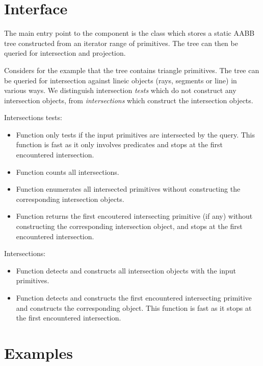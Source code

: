 \section{Interface}
\label{AABB_tree_section_interface}

The main entry point to the component is the class  which stores a static AABB tree constructed from an iterator range of primitives. The tree can then be queried for intersection and projection.


Considers for the example that the tree contains triangle primitives. The tree can be queried for intersection against lineic objects (rays, segments or line) in various ways. We distinguish intersection \emph{tests} which do not construct any intersection objects, from \emph{intersections} which construct the intersection objects.

Intersections tests:
\begin{itemize}
\item Function  only tests if the input primitives are intersected by the query. This function is fast as it only involves predicates and stops at the first encountered intersection.
\item Function  counts all  intersections.
\item Function  enumerates all intersected primitives without constructing the corresponding intersection objects.
\item Function  returns the first encoutered intersecting primitive (if any) without constructing the corresponding intersection object, and stops at the first encountered intersection.
\end{itemize}

Intersections:
\begin{itemize}
\item Function  detects and constructs all intersection objects with the input primitives.
\item Function  detects and constructs the first encountered intersecting primitive and constructs the corresponding object. This function is fast as it stops at the first encountered intersection.
\end{itemize}


\section{Examples}
\label{AABB_tree_section_examples}

